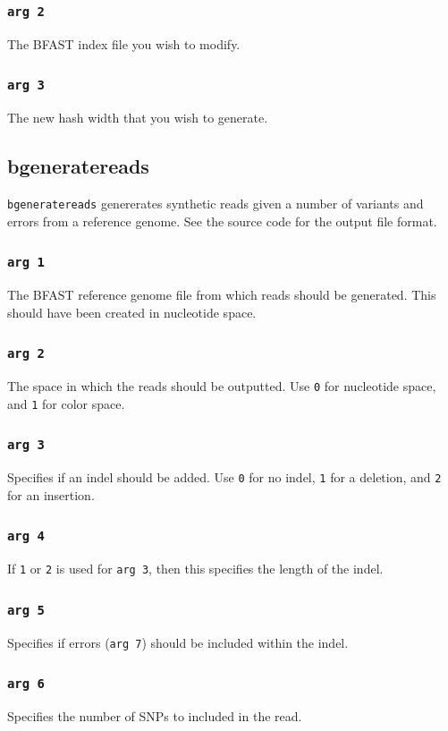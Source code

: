 \documentclass[a4paper,12pt]{book}
\newcommand{\TT}[1]{{\tt #1}} %
\newcommand{\BRGF}{BFAST reference genome file} %
\newcommand{\BIF}{BFAST index file} %
\begin{document}
\subsubsection{\TT{arg 2}}
The \BIF{} you wish to modify.

\subsubsection{\TT{arg 3}}
The new hash width that you wish to generate.

\subsection{bgeneratereads}
\label{sec:bgeneratereads}
\TT{bgeneratereads} genererates synthetic reads given a number of variants and errors from a reference genome.
See the source code for the output file format.

\subsubsection{\TT{arg 1}}
The \BRGF{} from which reads should be generated.
This should have been created in nucleotide space.
\subsubsection{\TT{arg 2}}
The space in which the reads should be outputted.
Use \TT{0} for nucleotide space, and \TT{1} for color space.
\subsubsection{\TT{arg 3}}
Specifies if an indel should be added.
Use \TT{0} for no indel, \TT{1} for a deletion, and \TT{2} for an insertion.
\subsubsection{\TT{arg 4}}
If \TT{1} or \TT{2} is used for \TT{arg 3}, then this specifies the length of the indel.
\subsubsection{\TT{arg 5}}
Specifies if errors (\TT{arg 7}) should be included within the indel. 
\subsubsection{\TT{arg 6}}
Specifies the number of SNPs to included in the read.
\end{document}
